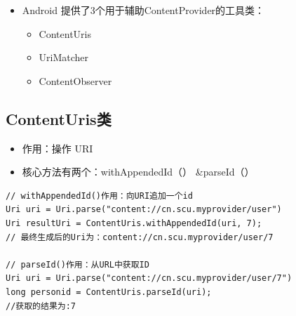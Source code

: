 \documentclass[9pt, b5paper]{article}
\begin{document}
\begin{itemize}
\item Android 提供了3个用于辅助ContentProvider的工具类：
\begin{itemize}
\item ContentUris
\item UriMatcher
\item ContentObserver
\end{itemize}
\end{itemize}
\subsection{ContentUris类}
\label{sec-1-5}
\begin{itemize}
\item 作用：操作 URI
\item 核心方法有两个：withAppendedId（） \&parseId（）
\end{itemize}
\begin{verbatim}
// withAppendedId()作用：向URI追加一个id
Uri uri = Uri.parse("content://cn.scu.myprovider/user") 
Uri resultUri = ContentUris.withAppendedId(uri, 7);  
// 最终生成后的Uri为：content://cn.scu.myprovider/user/7

// parseId()作用：从URL中获取ID
Uri uri = Uri.parse("content://cn.scu.myprovider/user/7") 
long personid = ContentUris.parseId(uri); 
//获取的结果为:7
\end{verbatim}
\end{document}
